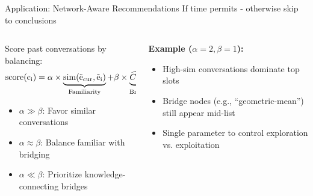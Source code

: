\documentclass[nodes]{beamer}
\begin{document}
\begin{frame}{Application: Network-Aware Recommendations}
  \scriptsize If time permits - otherwise skip to conclusions
  \normalsize
  
  \begin{columns}[T]
    \begin{column}{0.6\textwidth}
      Score past conversations by balancing:
      \vspace{0.1cm}
      \[
        \rm{score}(c_i) = \alpha \times
          \underbrace{\rm{sim}(\vec e_{\rm{cur}}, \vec e_i)}_{\rm{Familiarity}} + \beta \times \underbrace{\widehat{C_B}(c_i)}_{\rm{Bridging}} 
      \]
      \vspace{0.1cm}
      \begin{itemize}
        \item \scriptsize $\alpha \gg \beta$: Favor similar conversations
        \item \scriptsize $\alpha \approx \beta$: Balance familiar with bridging 
        \item \scriptsize $\alpha \ll \beta$: Prioritize knowledge-connecting bridges
      \end{itemize}
    \end{column}
    \begin{column}{0.4\textwidth}
      \scriptsize \textbf{Example ($\alpha=2, \beta=1$):}
      \begin{itemize}
        \item High-sim conversations dominate top slots
        \item Bridge nodes (e.g., ``geometric-mean'') still appear mid-list
        \item Single parameter to control exploration vs. exploitation
      \end{itemize}
    \end{column}
  \end{columns}
\end{frame}
\end{document}
